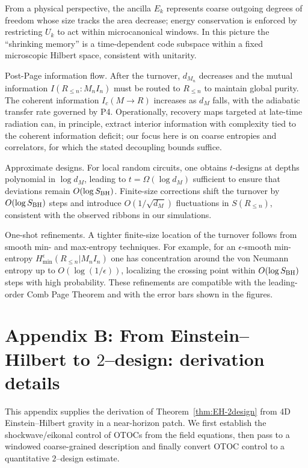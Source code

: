 \documentclass[a4paper,11pt]{article}
\theoremstyle{plain}
\theoremstyle{definition}
\theoremstyle{remark}
\begin{document}
From a physical perspective, the ancilla $E_k$ represents coarse outgoing degrees of freedom whose size tracks the area decrease; energy conservation is enforced by restricting $U_k$ to act within microcanonical windows. In this picture the ``shrinking memory'' is a time-dependent code subspace within a fixed microscopic Hilbert space, consistent with unitarity.

Post-Page information flow. After the turnover, $d_{M_n}$ decreases and the mutual information $I(R_{\le n}:M_n I_n)$ must be routed to $R_{\le n}$ to maintain global purity. The coherent information $I_c(M\to R)$ increases as $d_M$ falls, with the adiabatic transfer rate governed by P4. Operationally, recovery maps targeted at late-time radiation can, in principle, extract interior information with complexity tied to the coherent information deficit; our focus here is on coarse entropies and correlators, for which the stated decoupling bounds suffice.

Approximate designs. For local random circuits, one obtains $t$-designs at depths polynomial in $\log d_M$, leading to $t=\Omega(\log d_M)$ sufficient to ensure that deviations remain $O(\log S_{\rm BH})$. Finite-size corrections shift the turnover by $O(\log S_{\rm BH})$ steps and introduce $O(1/\sqrt{d_M})$ fluctuations in $S(R_{\le n})$, consistent with the observed ribbons in our simulations.

One-shot refinements. A tighter finite-size location of the turnover follows from smooth min- and max-entropy techniques. For example, for an $\epsilon$-smooth min-entropy $H_{\min}^{\epsilon}(R_{\le n}|M_n I_n)$ one has concentration around the von Neumann entropy up to $O(\log(1/\epsilon))$, localizing the crossing point within $O(\log S_{\rm BH})$ steps with high probability. These refinements are compatible with the leading-order Comb Page Theorem and with the error bars shown in the figures.

\section{Appendix B: From Einstein--Hilbert to \texorpdfstring{$2$}{2}--design: derivation details}
\label{app:EH-2design}

This appendix supplies the derivation of Theorem~\ref{thm:EH-2design} from 4D Einstein--Hilbert gravity in a near-horizon patch.
We first establish the shockwave/eikonal control of OTOCs from the field equations, then pass to a windowed coarse-grained description and finally convert OTOC control to a quantitative $2$--design estimate.
\end{document}
